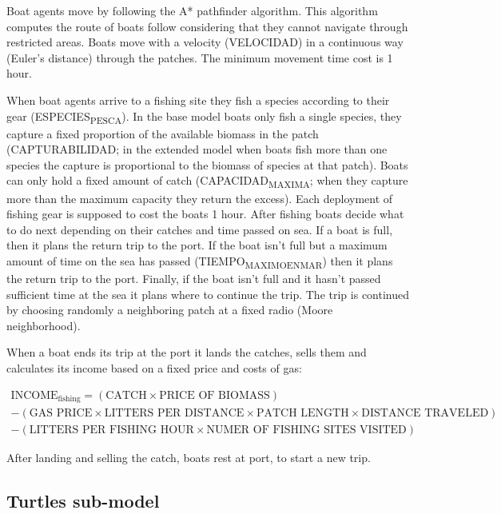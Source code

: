 \documentclass[11pt]{article}
\begin{document}
Boat agents move by following the A* pathfinder algorithm. This algorithm computes the route of boats follow considering that they cannot navigate through restricted areas. Boats move with a velocity (VELOCIDAD) in a continuous way (Euler's distance) through the patches. The minimum movement time cost is 1 hour.

When boat agents arrive to a fishing site they fish a species according to their gear (ESPECIES\textsubscript{PESCA}). In the base model boats only fish a single species, they capture a fixed proportion of the available biomass in the patch (CAPTURABILIDAD; in the extended model when boats fish more than one species the capture is proportional to the biomass of species at that patch). Boats can only hold a fixed amount of catch (CAPACIDAD\textsubscript{MAXIMA}; when they capture more than the maximum capacity they return the excess). Each deployment of fishing gear is supposed to cost the boats 1 hour. After fishing boats decide what to do next depending on their catches and time passed on sea. If a boat is full, then it plans the return trip to the port. If the boat isn't full but a maximum amount of time on the sea has passed (TIEMPO\textsubscript{MAXIMO}\textsubscript{EN}\textsubscript{MAR}) then it plans the return trip to the port. Finally, if the boat isn't full and it hasn't passed sufficient time at the sea it plans where to continue the trip. The trip is continued by choosing randomly a neighboring patch at a fixed radio (Moore neighborhood).

When a boat ends its trip at the port it lands the catches, sells them and calculates its income based on a fixed price and costs of gas:

\begin{align*}
\text{INCOME}_{\text{fishing}} = (\text{CATCH} \times \text{PRICE OF BIOMASS})\\
- (\text{GAS PRICE} \times \text{LITTERS PER DISTANCE} \times \text{PATCH LENGTH} \times \text{DISTANCE TRAVELED}) \\
- (\text{LITTERS PER FISHING HOUR} \times \text{NUMER OF FISHING SITES VISITED}) 
\end{align*}

After landing and selling the catch, boats rest at port, to start a new trip.

\subsection{Turtles sub-model}
\label{sec:org90fc245}
\end{document}
